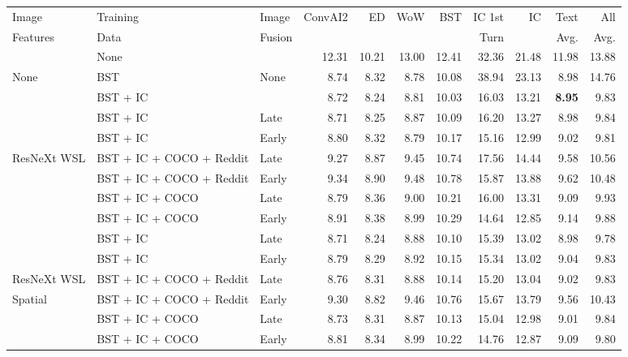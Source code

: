 \documentclass[11pt,a4paper]{article}
\begin{document}
\begin{table*}[t!]
\begin{center}
\small
\scriptsize
\begin{tabular}{|l|l|l|r|r|r|r|r|r||r|r| }
 \hline
Image  & Training & Image & ConvAI2 & ED & WoW & BST & IC 1st & IC & Text & All \\
Features & Data & Fusion & & &  & & Turn  &  & Avg. & Avg. \\
\hline
  & None & & 12.31 & 10.21 & 13.00 & 12.41 & 32.36 & 21.48 & 11.98 & 13.88 \\
None & BST & None & 8.74 & 8.32 & 8.78 & 10.08 & 38.94 & 23.13 & 8.98 & 14.76 \\ 
 & BST + IC & & 8.72 & 8.24 & 8.81 & 10.03 & 16.03 & 13.21 & \textbf{8.95} & 9.83 \\ 
 \hline
 \hline
 & BST + IC & Late & 8.71 & 8.25 & 8.87 & 10.09 & 16.20 & 13.27 & 8.98 & 9.84 \\ 
 & BST + IC & Early  & 8.80 & 8.32 & 8.79 & 10.17 & 15.16 & 12.99 & 9.02 & 9.81 \\ 
ResNeXt WSL & BST + IC + COCO + Reddit & Late & 9.27 & 8.87 & 9.45 & 10.74 & 17.56 & 14.44 & 9.58 & 10.56 \\ 
 & BST + IC + COCO + Reddit & Early & 9.34 & 8.90 & 9.48 & 10.78 & 15.87 & 13.88 & 9.62 & 10.48 \\ 
 & BST + IC + COCO & Late & 8.79 & 8.36 & 9.00 & 10.21 & 16.00 & 13.31 & 9.09 & 9.93 \\ 
 & BST + IC + COCO & Early & 8.91 & 8.38 & 8.99 & 10.29 & 14.64 & 12.85 & 9.14 & 9.88 \\ 
 
 \hline
 \hline
 & BST + IC& Late & 8.71 & 8.24 & 8.88 & 10.10 & 15.39 & 13.02 & 8.98 & 9.78 \\ 
 & BST + IC& Early& 8.79 & 8.29 & 8.92 & 10.15 & 15.34 & 13.02 & 9.04 & 9.83 \\ 
ResNeXt WSL & BST + IC + COCO + Reddit& Late & 8.76 & 8.31 & 8.88 & 10.14 & 15.20 & 13.04 & 9.02 & 9.83 \\  
Spatial & BST + IC + COCO + Reddit& Early& 9.30 & 8.82 & 9.46 & 10.76 & 15.67 & 13.79 & 9.56 & 10.43 \\ 
 & BST + IC + COCO& Late & 8.73 & 8.31 & 8.87 & 10.13 & 15.04 & 12.98 & 9.01 & 9.84 \\ 
 & BST + IC + COCO& Early& 8.81 & 8.34 & 8.99 & 10.22 & 14.76 & 12.87 & 9.09 & 9.80 \\ 


\end{tabular}
\end{center}
\end{table*}
\end{document}

